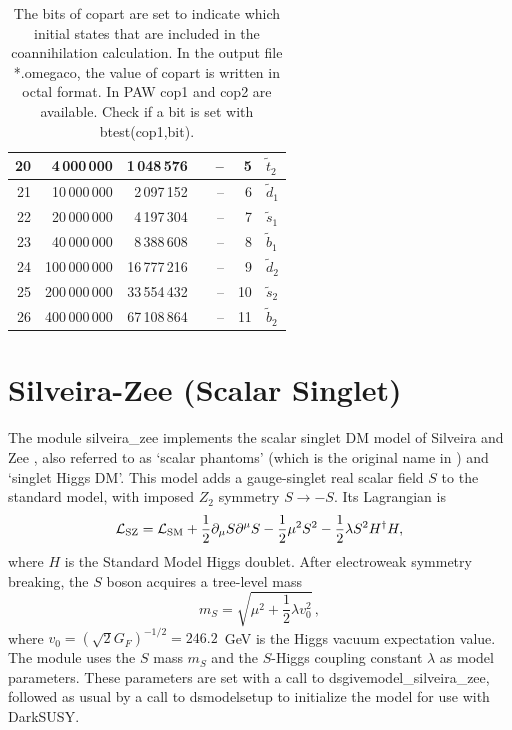 \documentclass[a4paper,10pt,oneside]{book}
\newcommand{\code}[1]{\ft{#1}}
\newcommand{\ds}{{\sffamily DarkSUSY}}
\newcommand{\ft}[1]{\textsf{#1}}
\begin{document}
\begin{table}[!h]
\begin{tabular}{rrrcrrl}
20 &   4\,000\,000 &  1\,048\,576 &&  -- &   5 & $\tilde{t}_2$ \\ \hline
21 &  10\,000\,000 &  2\,097\,152 &&  -- &   6 & $\tilde{d}_1$ \\
22 &  20\,000\,000 &  4\,197\,304 &&  -- &   7 & $\tilde{s}_1$ \\
23 &  40\,000\,000 &  8\,388\,608 &&  -- &   8 & $\tilde{b}_1$ \\
24 & 100\,000\,000 & 16\,777\,216 &&  -- &   9 & $\tilde{d}_2$ \\
25 & 200\,000\,000 & 33\,554\,432 &&  -- &  10 & $\tilde{s}_2$ \\
26 & 400\,000\,000 & 67\,108\,864 &&  -- &  11 & $\tilde{b}_2$ \\ \hline
\end{tabular}
\caption{The bits of \code{copart} are set to indicate which initial states that
are included in the coannihilation calculation. In the output file \code{*.omegaco}, the value of \code{copart} is written in octal format. In PAW \code{cop1} and \code{cop2} are available. Check if a bit is set with \code{btest(cop1,bit)}.}
\label{tab:copart}
\end{table}
\chapter{Silveira-Zee (Scalar Singlet)}

The module \code{silveira\_zee} implements the scalar singlet DM model of Silveira and 
Zee \cite{Silveira:1985rk}, also referred to as `scalar phantoms' (which is the original name 
in \cite{Silveira:1985rk}) and `singlet Higgs DM'.  
This model adds a gauge-singlet real scalar field $S$ to the standard 
model, with imposed $Z_2$ symmetry $S\to -S$. Its Lagrangian is
\begin{equation}
{\cal L}_{\rm SZ} = {\cal L}_{\rm SM} + \frac{1}{2} \partial_\mu S \partial^\mu S - \frac{1}{2} \mu^2 S^2 - \frac{1}{2} \lambda S^2 H^\dagger H,
\end{equation}
where $H$ is the Standard Model Higgs doublet. After electroweak symmetry breaking, the $S$ boson 
acquires a tree-level mass
\begin{equation}
m_S = \sqrt{\mu^2 + \frac{1}{2} \lambda v_0^2}\,,
\end{equation}
where $v_0=(\sqrt{2} G_F)^{-1/2}=246.2$~GeV is the Higgs vacuum expectation value.
The module uses the $S$ mass $m_S$ and the $S$-Higgs coupling constant 
$\lambda$ as model parameters. These parameters are set with a call to
\code{dsgivemodel\_silveira\_zee}, followed as usual by a call to \code{dsmodelsetup}
to initialize the model for use with \ds.
\end{document}
